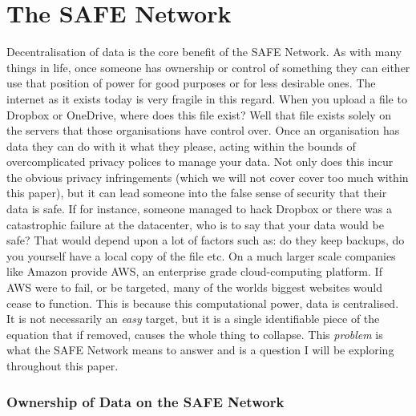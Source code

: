 \chapter{The SAFE Network}
\label{ch:thesafenetwork}

Decentralisation of data is the core benefit of the SAFE Network. As with many things in life, once someone has ownership or control of something they can either use that position of power for good purposes or for less desirable ones. The internet as it exists today is very fragile in this regard. When you upload a file to Dropbox or OneDrive, where does this file exist? Well that file exists solely on the servers that those organisations have control over. Once an organisation has data they can do with it what they please, acting within the bounds of overcomplicated privacy polices to manage your data. Not only does this incur the obvious privacy infringements (which we will not cover cover too much within this paper), but it can lead someone into the false sense of security that their data is safe. If for instance, someone managed to hack Dropbox or there was a catastrophic failure at the datacenter, who is to say that your data would be safe? That would depend upon a lot of factors such as: do they keep backups, do you yourself have a local copy of the file etc. On a much larger scale companies like Amazon provide AWS, an enterprise grade cloud-computing platform. If AWS were to fail, or be targeted, many of the worlds biggest websites would cease to function. This is because this computational power, data is centralised. It is not necessarily an \textit{easy} target, but it is a single identifiable piece of the equation that if removed, causes the whole thing to collapse. This \textit{problem} is what the SAFE Network means to answer and is a question I will be exploring throughout this paper.

\subsection{Ownership of Data on the SAFE Network}


